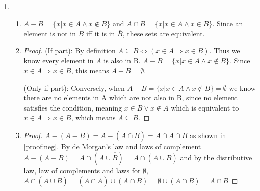 \documentclass{article}
\begin{document}
\begin{enumerate}
    \item
        \begin{enumerate}
            \item \label{proof:neg} $A - B = \{x | x \in A \land x \not\in B\}$ and $A \cap \overline{B} = \{x | x \in A \land x \in \overline{B}\}$. Since an element is not in $B$ iff it is in $\overline{B}$, these sets are equivalent.
            \item 
                \begin{proof}
                    (If part): By definition $A \subseteq B \Leftrightarrow (x \in A \Rightarrow x \in B)$. Thus we know every element in $A$ is also in B. $A - B = \{x | x \in A \land x \not\in B\}$. Since $x \in A \Rightarrow x \in B$, this means $A - B = \emptyset$.

                    (Only-if part): Conversely, when $A - B = \{x|x\in A \land x \not\in B\} = \emptyset$ we know there are no elements in A which are not also in B, since no element satisfies the condition, meaning $ x \in B \lor x \not\in A$ which is equivalent to $x \in A \Rightarrow x \in B$, which means $A \subseteq B$.
                \end{proof}
            \item 
                \begin{proof}
                    $A - (A - B) = A - (A \cap \overline B) = A \cap \overline{A \cap \overline{B}}$ as shown in \ref{proof:neg}. By de Morgan's law and laws of complement $A - (A - B) = A \cap (\overline{A} \cup \overline{\overline{B}}) =  A \cap (\overline{A} \cup B)$ and by the distributive law, law of complements and laws for $\emptyset$, $ A \cap (\overline{A} \cup B) = (A \cap \overline{A}) \cup (A \cap B) = \emptyset \cup (A \cap B) = A \cap B$ 
                \end{proof}


\end{enumerate}
\end{enumerate}
\end{document}
